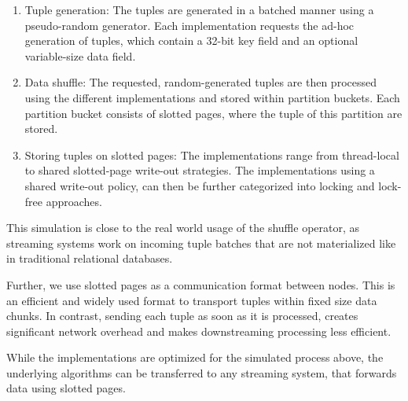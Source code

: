 \begin{enumerate}
  \item Tuple generation: The tuples are generated in a batched manner using a pseudo-random generator.
        Each implementation requests the ad-hoc generation of tuples, which contain a 32-bit key field and an optional variable-size data field.

  \item Data shuffle: The requested, random-generated tuples are then processed using the different implementations and stored within partition buckets.
        Each partition bucket consists of slotted pages, where the tuple of this partition are stored.

  \item Storing tuples on slotted pages: The implementations range from thread-local to shared slotted-page write-out strategies.
        The implementations using a shared write-out policy, can then be further categorized into locking and lock-free approaches.
\end{enumerate}
This simulation is close to the real world usage of the shuffle operator, as streaming systems work on incoming tuple batches that are not materialized like in traditional relational databases.

Further, we use slotted pages as a communication format between nodes.
This is an efficient and widely used format to transport tuples within fixed size data chunks.
In contrast, sending each tuple as soon as it is processed, creates significant network overhead and makes downstreaming processing less efficient.

While the implementations are optimized for the simulated process above, the underlying algorithms can be transferred to any streaming system, that forwards data using slotted pages.
